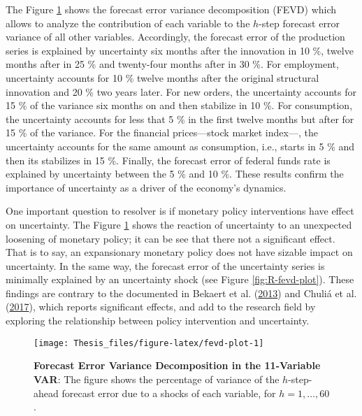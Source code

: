 \documentclass[12pt,twoside]{reedthesis}
\begin{document}
The Figure \ref{fig:fevd-plot} shows the forecast error variance decomposition (FEVD) which allows to analyze the contribution of each variable to the \(h\)-step forecast error variance of all other variables. Accordingly, the forecast error of the production series is explained by uncertainty six months after the innovation in 10 \%, twelve months after in 25 \% and twenty-four months after in 30 \%. For employment, uncertainty accounts for 10 \% twelve months after the original structural innovation and 20 \% two years later. For new orders, the uncertainty accounts for 15 \% of the variance six months on and then stabilize in 10 \%. For consumption, the uncertainty accounts for less that 5 \% in the first twelve months but after for 15 \% of the variance. For the financial prices---stock market index---, the uncertainty accounts for the same amount as consumption, i.e., starts in 5 \% and then its stabilizes in 15 \%. Finally, the forecast error of federal funds rate is explained by uncertainty between the 5 \% and 10 \%. These results confirm the importance of uncertainty as a driver of the economy's dynamics.

One important question to resolver is if monetary policy interventions have effect on uncertainty. The Figure \ref{fig:fevd-plot} shows the reaction of uncertainty to an unexpected loosening of monetary policy; it can be see that there not a significant effect. That is to say, an expansionary monetary policy does not have sizable impact on uncertainty. In the same way, the forecast error of the uncertainty series is minimally explained by an uncertainty shock (see Figure \ref{fig:R-fevd-plot}). These findings are contrary to the documented in Bekaert et al. (\protect\hyperlink{ref-bekahoerduca:2013}{2013}) and Chuliá et al. (\protect\hyperlink{ref-chulguilurib:2017}{2017}), which reports significant effects, and add to the research field by exploring the relationship between policy intervention and uncertainty.


\begin{figure}

{\centering \texttt{[image: Thesis\_files/figure-latex/fevd-plot-1]} 

}

\caption[Forecast Error Variance Decomposition in the 11-Variable VAR]{\textbf{Forecast Error Variance Decomposition in the 11-Variable VAR}: The figure shows the percentage of variance of the \(h\)-step-ahead forecast error due to a shocks of each variable, for \(h = 1, \ldots, 60\).}\label{fig:fevd-plot}
\end{figure}
\end{document}
